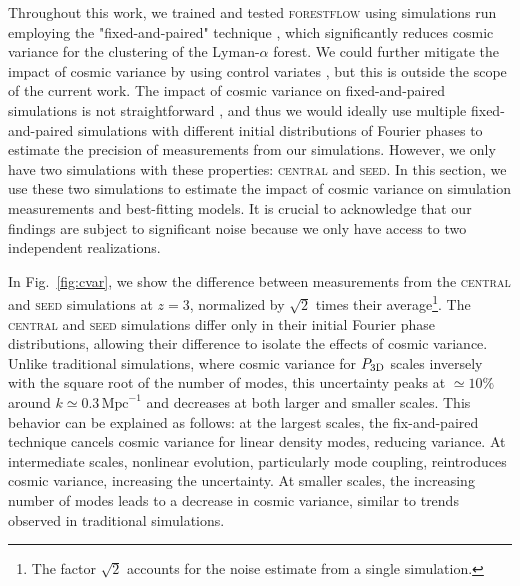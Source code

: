 \documentclass[longauth]{aa}
\newcommand{\lyaf}{Lyman-$\alpha$ forest\xspace}
\newcommand{\pthreed}{\ensuremath{P_{\rm 3D}}\xspace}
\newcommand{\forestflow}{\textsc{forestflow}\xspace}
\newcommand{\simseed}{\textsc{seed}\xspace}
\newcommand{\simcentral}{\textsc{central}\xspace}
\newcommand{\iMpc}{\ensuremath{\,\mathrm{Mpc}^{-1}}}
\begin{document}
\begin{appendix}
Throughout this work, we trained and tested \forestflow using simulations run employing the "fixed-and-paired" technique \citep{angulo2016CosmologicalNbodySimulations, pontzen2016InvertedInitialConditions}, which significantly reduces cosmic variance for the clustering of the \lyaf \citep{anderson2019CosmologicalHydrodynamicSimulations}. We could further mitigate the impact of cosmic variance by using control variates \citep{Kokron2022}, but this is outside the scope of the current work. The impact of cosmic variance on fixed-and-paired simulations is not straightforward \citep{maion2022fpvariance}, and thus we would ideally use multiple fixed-and-paired simulations with different initial distributions of Fourier phases to estimate the precision of measurements from our simulations. However, we only have two simulations with these properties: \simcentral and \simseed. In this section, we use these two simulations to estimate the impact of cosmic variance on simulation measurements and best-fitting models. It is crucial to acknowledge that our findings are subject to significant noise because we only have access to two independent realizations.

In Fig.~\ref{fig:cvar}, we show the difference between measurements from the \simcentral and \simseed simulations at $z=3$, normalized by $\sqrt{2}$ times their average\footnote{The factor $\sqrt{2}$ accounts for the noise estimate from a single simulation.}. The \simcentral and \simseed simulations differ only in their initial Fourier phase distributions, allowing their difference to isolate the effects of cosmic variance. Unlike traditional simulations, where cosmic variance for \pthreed scales inversely with the square root of the number of modes, this uncertainty peaks at $\simeq10\%$ around $k\simeq0.3\iMpc$ and decreases at both larger and smaller scales. This behavior can be explained as follows: at the largest scales, the fix-and-paired technique cancels cosmic variance for linear density modes, reducing variance. At intermediate scales, nonlinear evolution, particularly mode coupling, reintroduces cosmic variance, increasing the uncertainty. At smaller scales, the increasing number of modes leads to a decrease in cosmic variance, similar to trends observed in traditional simulations.


\end{appendix}
\end{document}
